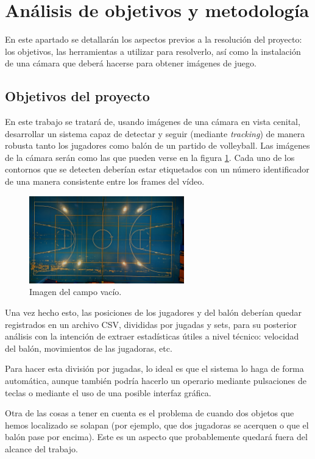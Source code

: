 \section{Análisis de objetivos y metodología}
En este apartado se detallarán los aspectos previos a la resolución del proyecto: los objetivos, las herramientas a utilizar para resolverlo, así como la instalación de una cámara que deberá hacerse para obtener imágenes de juego.

\subsection{Objetivos del proyecto}
En este trabajo se tratará de, usando imágenes de una cámara en vista cenital, desarrollar un sistema capaz de detectar y seguir (mediante \textit{tracking}) de manera robusta tanto los jugadores como balón de un partido de volleyball. Las imágenes de la cámara serán como las que pueden verse en la figura \ref{fig:campo}. Cada uno de los contornos que se detecten deberían estar etiquetados con un número identificador de una manera consistente entre los frames del vídeo.

\begin{figure}
    \centering
    \includegraphics[width=0.6\textwidth]{images/campo}
    \caption{Imagen del campo vacío.}
    \label{fig:campo}
\end{figure}

Una vez hecho esto, las posiciones de los jugadores y del balón deberían quedar registrados en un archivo CSV, divididas por jugadas y sets, para su posterior análisis con la intención de extraer estadísticas útiles a nivel técnico: velocidad del balón, movimientos de las jugadoras, etc. 

Para hacer esta división por jugadas, lo ideal es que el sistema lo haga de forma automática, aunque también podría hacerlo un operario mediante pulsaciones de teclas o mediante el uso de una posible interfaz gráfica.

Otra de las cosas a tener en cuenta es el problema de cuando dos objetos que hemos localizado se solapan (por ejemplo, que dos jugadoras se acerquen o que el balón pase por encima). Este es un aspecto que probablemente quedará fuera del alcance del trabajo.


